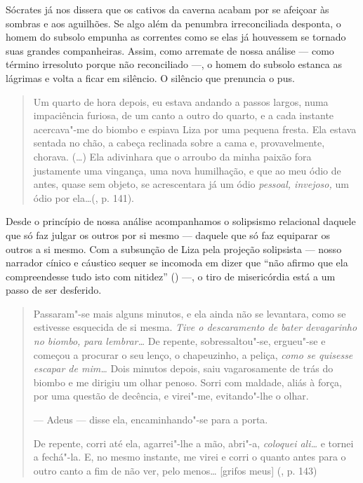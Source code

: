 Sócrates já nos dissera que os cativos da caverna acabam por se afeiçoar
às sombras e aos aguilhões. Se algo além da penumbra irreconciliada
desponta, o homem do subsolo empunha as correntes como se elas já
houvessem se tornado suas grandes companheiras. Assim, como arremate de
nossa análise --- como término irresoluto porque não reconciliado ---, o
homem do subsolo estanca as lágrimas e volta a ficar em silêncio. O
silêncio que prenuncia o pus.

\begin{quote}
Um quarto de hora depois, eu estava andando a passos largos, numa
impaciência furiosa, de um canto a outro do quarto, e a cada instante
acercava"-me do biombo e espiava Liza por uma pequena fresta. Ela estava
sentada no chão, a cabeça reclinada sobre a cama e, provavelmente,
chorava. (\ldots) Ela adivinhara que o arroubo da minha paixão fora
justamente uma vingança, uma nova humilhação, e que ao meu ódio de
antes, quase sem objeto, se acrescentara já um ódio \emph{pessoal,
invejoso,} um ódio por ela\ldots (, p. 141).
\end{quote}

Desde o princípio de nossa análise acompanhamos o solipsismo relacional
daquele que só faz julgar os outros por si mesmo --- daquele que só faz
equiparar os outros a si mesmo. Com a subsunção de Liza pela projeção
solipsista --- nosso narrador cínico e cáustico sequer se incomoda em
dizer que ``não afirmo que ela compreendesse tudo isto com nitidez''
() ---, o tiro de misericórdia está a um passo de ser desferido.

\begin{quote}
Passaram"-se mais alguns minutos, e ela ainda não se levantara, como se
estivesse esquecida de si mesma. \emph{Tive o descaramento de bater
devagarinho no biombo, para lembrar\ldots} De repente, sobressaltou"-se,
ergueu"-se e começou a procurar o seu lenço, o chapeuzinho, a peliça,
\emph{como se quisesse escapar de mim\ldots} Dois minutos depois, saiu
vagarosamente de trás do biombo e me dirigiu um olhar penoso. Sorri com
maldade, aliás à força, por uma questão de decência, e virei"-me,
evitando"-lhe o olhar.

\noindent --- Adeus --- disse ela, encaminhando"-se para a porta.

\noindent De repente, corri até ela, agarrei"-lhe a mão, abri"-a, \emph{coloquei
ali\ldots} e tornei a fechá"-la. E, no mesmo instante, me virei e corri o
quanto antes para o outro canto a fim de não ver, pelo menos\ldots
{[}grifos meus{]} (, p. 143)
\end{quote}

